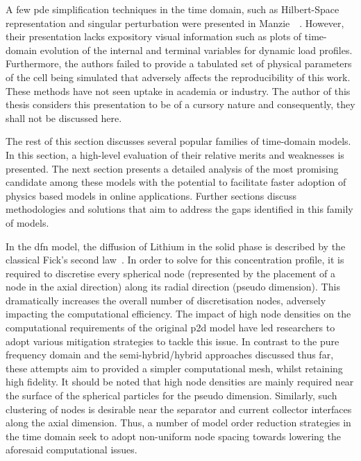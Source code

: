 A  few  \gls{pde}  simplification  techniques   in  the  time  domain,  such  as
Hilbert-Space  representation  and  singular   perturbation  were  presented  in
Manzie~\eta{}~\cite{Manzie2015}.  However, their  presentation lacks  expository
visual information  such as plots of  time-domain evolution of the  internal and
terminal variables for dynamic load profiles. Furthermore, the authors failed to
provide a tabulated set of physical  parameters of the cell being simulated that
adversely affects the reproducibility of this  work. These methods have not seen
uptake  in academia  or  industry.  The author  of  this  thesis considers  this
presentation  to be  of a  cursory nature  and consequently,  they shall  not be
discussed here.


The  rest of  this section  discusses  several popular  families of  time-domain
models. In  this section, a high-level  evaluation of their relative  merits and
weaknesses is  presented. The next section  presents a detailed analysis  of the
most promising  candidate among  these models with  the potential  to facilitate
faster adoption of physics based models in online applications. Further sections
discuss methodologies and  solutions that aim to address the  gaps identified in
this family of models. 


In the \gls{dfn} model, the diffusion of Lithium in the solid phase is described
by the classical  Fick's second law~\cite{Fick1995}. In order to  solve for this
concentration  profile,  it  is  required to  discretise  every  spherical  node
(represented by the placement of a node in the axial direction) along its radial
direction (pseudo dimension). This dramatically  increases the overall number of
discretisation  nodes, adversely  impacting  the  computational efficiency.  The
impact of high node densities on  the computational requirements of the original
\gls{p2d}  model have  led researchers  to adopt  various mitigation  strategies
to  tackle  this  issue. In  contrast  to  the  pure  frequency domain  and  the
semi-hybrid/hybrid approaches discussed thus far, these attempts aim to provided
a simpler computational mesh, whilst retaining high fidelity. It should be noted
that high node  densities are mainly required near the  surface of the spherical
particles for the pseudo   dimension. Similarly, such clustering
of nodes is desirable near the  separator and current collector interfaces along
the axial  dimension.
Thus, a number  of model order reduction  strategies in the time  domain seek to
adopt  non-uniform node  spacing  towards lowering  the aforesaid  computational
issues.


